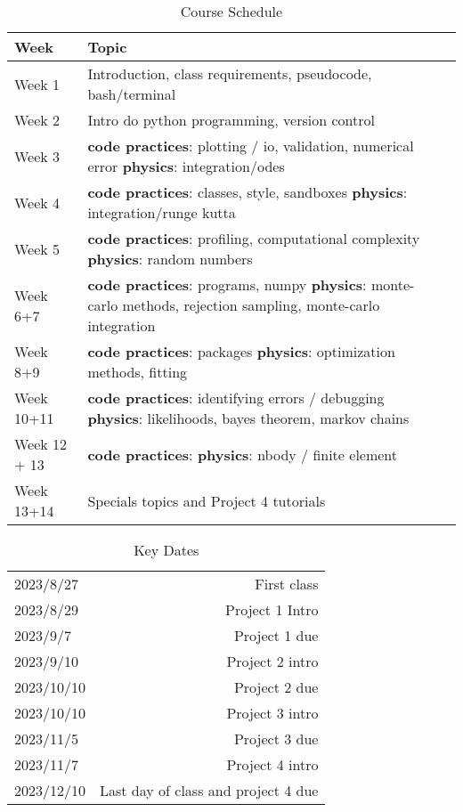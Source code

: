 \documentclass[12pt]{article}
\begin{document}
\begin{table}[h]
  \caption{Course Schedule}
\begin{center}
  \begin{tabular}{|p{3cm}|m{10cm} | @{}m{0pt}@{}}
     \toprule
     \textbf{Week} & \textbf{Topic} \\\hline
    Week 1 & Introduction, class requirements, pseudocode, bash/terminal \\ \hline
    Week 2 & Intro do python programming, version control \\
    Week 3 & \textbf{code practices}: plotting / io, validation, numerical error \textbf{physics}: integration/odes \\\hline
    Week 4 & \textbf{code practices}: classes, style, sandboxes \textbf{physics}: integration/runge kutta \\\hline
    Week 5 & \textbf{code practices}: profiling, computational complexity \textbf{physics}: random numbers \\\hline
    Week 6+7 & \textbf{code practices}: programs, numpy \textbf{physics}: monte-carlo methods, rejection sampling, monte-carlo integration \\\hline
    Week 8+9 & \textbf{code practices}: packages \textbf{physics}: optimization methods, fitting \\\hline
    Week 10+11 & \textbf{code practices}: identifying errors / debugging \textbf{physics}: likelihoods, bayes theorem, markov chains \\\hline
    Week 12 + 13 & \textbf{code practices}: \textbf{physics}: nbody / finite element \\\hline
    Week 13+14 & Specials topics and Project 4 tutorials \\
    \bottomrule
  \end{tabular}
\end{center}
\end{table}

\begin{table}[h]
  \caption{Key Dates}
\begin{center}
  \begin{tabular}{l|r}
    \toprule
    2023/8/27 & First class \\
    2023/8/29 & Project 1 Intro \\
    2023/9/7 & Project 1 due \\
    2023/9/10 & Project 2 intro \\
    2023/10/10 & Project 2 due \\
    2023/10/10 & Project 3 intro \\
    2023/11/5 & Project 3 due \\
    2023/11/7 & Project 4 intro \\
    2023/12/10 & Last day of class and project 4 due \\
    \bottomrule
  \end{tabular}
\end{center}
\end{table}
\end{document}
